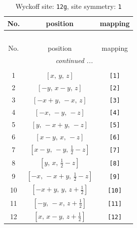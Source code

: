 \documentclass[fleqn,8pt]{jsarticle}
\begin{document}
\renewcommand{\arraystretch}{1.2}
\begin{longtable}{ccc}
\caption{Wyckoff site: {\tt 12g}, site symmetry: {\tt 1}}
 \\
 \hline \hline
No. & position & mapping \\ \hline \endfirsthead

\multicolumn{2}{l}{\tablename\ \thetable{}} \\
 \hline \hline
No. & position & mapping \\ \hline \endhead

 \hline \hline
\multicolumn{2}{r}{\footnotesize\it continued ...} \\ \endfoot

 \hline \hline
\multicolumn{2}{r}{} \\ \endlastfoot

1 & $\left[ x,\, y,\, z \right]$ & {\tt [1]} \\ \hline
2 & $\left[ - y,\, x - y,\, z \right]$ & {\tt [2]} \\ \hline
3 & $\left[ - x + y,\, - x,\, z \right]$ & {\tt [3]} \\ \hline
4 & $\left[ - x,\, - y,\, - z \right]$ & {\tt [4]} \\ \hline
5 & $\left[ y,\, - x + y,\, - z \right]$ & {\tt [5]} \\ \hline
6 & $\left[ x - y,\, x,\, - z \right]$ & {\tt [6]} \\ \hline
7 & $\left[ x - y,\, - y,\, \frac{1}{2} - z \right]$ & {\tt [7]} \\ \hline
8 & $\left[ y,\, x,\, \frac{1}{2} - z \right]$ & {\tt [8]} \\ \hline
9 & $\left[ - x,\, - x + y,\, \frac{1}{2} - z \right]$ & {\tt [9]} \\ \hline
10 & $\left[ - x + y,\, y,\, z + \frac{1}{2} \right]$ & {\tt [10]} \\ \hline
11 & $\left[ - y,\, - x,\, z + \frac{1}{2} \right]$ & {\tt [11]} \\ \hline
12 & $\left[ x,\, x - y,\, z + \frac{1}{2} \right]$ & {\tt [12]} \\
\end{longtable}
\end{document}
